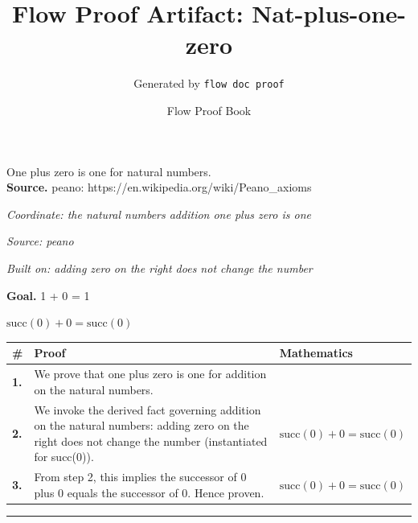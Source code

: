 \documentclass[11pt]{article}
\title{Flow Proof Artifact: Nat-plus-one-zero}
\author{Generated by \texttt{flow doc proof}}
\date{Flow Proof Book}
\theoremstyle{definition}
\begin{document}
\maketitle
One plus zero is one for natural numbers.\\[0.5em]
\textbf{Source.} peano: https://en.wikipedia.org/wiki/Peano\_axioms\\[0.5em]
\bigskip
{}\par
\smallskip\noindent\textit{Coordinate: the natural numbers \cdot addition \cdot one plus zero is one}\par
\smallskip\noindent\textit{Source: peano}\par
\smallskip\noindent\textit{Built on: adding zero on the right does not change the number}\par
\medskip
\noindent\textbf{Goal.} 1 + 0 = 1\par
\noindent$\displaystyle \mathrm{succ}(0) + 0 = \mathrm{succ}(0)$\par
\medskip
\noindent
\begin{tabular}{@{} >{\raggedright\arraybackslash}p{} >{\raggedright\arraybackslash}p{} >{\raggedleft\arraybackslash}p{} @{}}
\textbf{\#} & \textbf{Proof} & \textbf{Mathematics} \\
\midrule
\textbf{1.} & We prove that one plus zero is one for addition on the natural numbers. & \\[0.45em]
\textbf{2.} & We invoke the derived fact governing addition on the natural numbers: adding zero on the right does not change the number (instantiated for succ(0)). & $\displaystyle \mathrm{succ}(0) + 0 = \mathrm{succ}(0)$ \\[0.45em]
\textbf{3.} & From step 2, this implies the successor of 0 plus 0 equals the successor of 0. Hence proven. & $\displaystyle \mathrm{succ}(0) + 0 = \mathrm{succ}(0)$ \\[0.45em]
\bottomrule
\end{tabular}
\label{thm:Nat-addition-one_plus_zero_is_one}
\par\medskip\hrule
\end{document}
